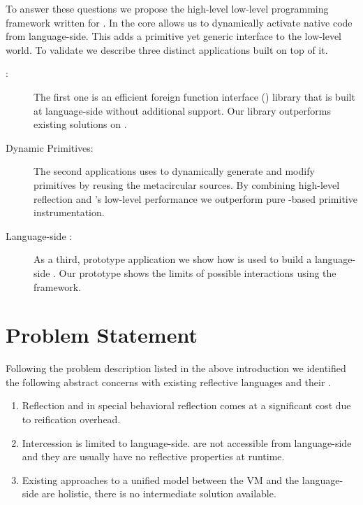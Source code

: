 To answer these questions we propose the high-level low-level programming framework \B written for \PH.
In the core \B allows us to dynamically activate native code from language-side.
This adds a primitive yet generic interface to the low-level \VM world.
To validate \B we describe three distinct applications built on top of it.
%
\begin{description}
	\item[\FFI:] The first one is an efficient foreign function interface (\FFI) library that is built at language-side without additional \VM support.
	Our \FFI library outperforms existing solutions on \PH.
	
	\item[Dynamic Primitives:] The second applications uses \B to dynamically generate and modify \PH primitives by reusing the metacircular \VM sources.
	By combining high-level reflection and \B's low-level performance we outperform pure \PH-based primitive instrumentation.
	
	\item[Language-side \JIT:] As a third, prototype application we show how \B is used to build a language-side \JIT.
	Our prototype shows the limits of possible \VM interactions using the \B framework. 
\end{description}


\section{Problem Statement}
Following the problem description listed in the above introduction we identified the following abstract concerns with existing reflective languages and their \VMs.
%
\begin{enumerate}
	\item Reflection and in special behavioral reflection comes at a significant cost due to reification overhead.
		
	\item Intercession is limited to language-side.
	\VMs are not accessible from language-side and they are usually have no reflective properties at runtime. 
	
	\item Existing approaches to a unified model between the VM and the language-side are holistic, there is no intermediate solution available.
\end{enumerate}

